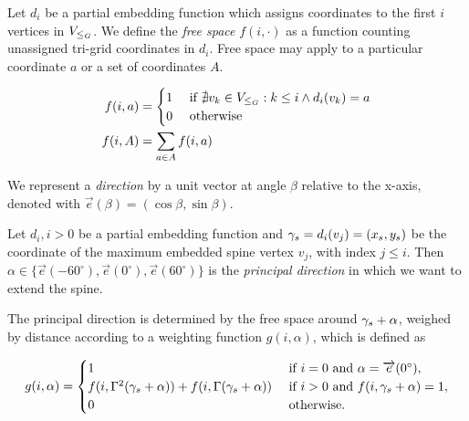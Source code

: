 Let $d_i$ be a partial embedding function which assigns coordinates to the first $i$ vertices in $V_{\leq_G}$. We define the \emph{free space} $f(i, \cdot)$ as a function counting unassigned tri-grid coordinates in $d_i$. Free space may apply to a particular coordinate $a$ or a set of coordinates $A$.

\begin{equation*}
\begin{aligned}
f(i, a) &= \begin{cases}1 & \text{ if } \nexists v_k \in V_{\leq_G}: k \leq i \wedge d_i(v_k) = a \\ 0 & \text{ otherwise} \end{cases}\\
f(i, A) &= \sum\limits_{a \in A} f(i, a)
\end{aligned}
\end{equation*}

We represent a \emph{direction} by a unit vector at angle $\beta$ relative to the x-axis, denoted with $\overrightarrow e(\beta) = (\cos \beta, \sin \beta)$.

Let $d_i, i > 0$ be a partial embedding function and $\gamma_s = d_i(v_j) = (x_s, y_s)$ be the coordinate of the maximum embedded spine vertex $v_j$, with index $j \leq i$. Then $\alpha \in \{ \overrightarrow e(-60^\circ), \overrightarrow e(0^\circ), \overrightarrow e(60^\circ) \}$ is the \emph{principal direction} in which we want to extend the spine.

The principal direction is determined by the free space around $\gamma_s + \alpha$, weighed by distance according to a weighting function $g(i, \alpha)$, which is defined as

\begin{equation*}
g(i, \alpha) = \begin{cases}
    1 & \text{ if } i=0 \text{ and } \alpha = \overrightarrow e(0^\circ), \\
    f(i, \Gamma^2(\gamma_s + \alpha)) + f(i, \Gamma(\gamma_s + \alpha)) & \text{ if } i>0 \text{ and } f(i, \gamma_s + \alpha) = 1, \\
    0 & \text{ otherwise.}
\end{cases}
\end{equation*}

